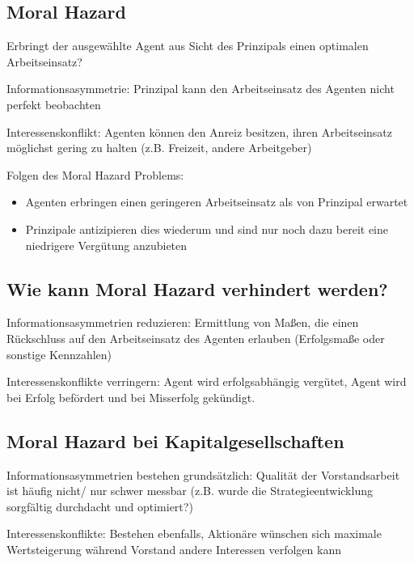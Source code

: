 \documentclass[
]{article}
\providecommand{\tightlist}{%
  \setlength{\itemsep}{0pt}\setlength{\parskip}{0pt}}
\begin{document}
\hypertarget{moral-hazard}{%
\subsection{Moral Hazard}\label{moral-hazard}}

Erbringt der ausgewählte Agent aus Sicht des Prinzipals einen optimalen
Arbeitseinsatz?

Informationsasymmetrie: Prinzipal kann den Arbeitseinsatz des Agenten
nicht perfekt beobachten

Interessenskonflikt: Agenten können den Anreiz besitzen, ihren
Arbeitseinsatz möglichst gering zu halten (z.B. Freizeit, andere
Arbeitgeber)

Folgen des Moral Hazard Problems:

\begin{itemize}
\tightlist
\item
  Agenten erbringen einen geringeren Arbeitseinsatz als von Prinzipal
  erwartet
\item
  Prinzipale antizipieren dies wiederum und sind nur noch dazu bereit
  eine niedrigere Vergütung anzubieten
\end{itemize}

\hypertarget{wie-kann-moral-hazard-verhindert-werden}{%
\subsection{Wie kann Moral Hazard verhindert
werden?}\label{wie-kann-moral-hazard-verhindert-werden}}

Informationsasymmetrien reduzieren: Ermittlung von Maßen, die einen
Rückschluss auf den Arbeitseinsatz des Agenten erlauben (Erfolgsmaße
oder sonstige Kennzahlen)

Interessenskonflikte verringern: Agent wird erfolgsabhängig vergütet,
Agent wird bei Erfolg befördert und bei Misserfolg gekündigt.

\hypertarget{moral-hazard-bei-kapitalgesellschaften}{%
\subsection{Moral Hazard bei
Kapitalgesellschaften}\label{moral-hazard-bei-kapitalgesellschaften}}

Informationsasymmetrien bestehen grundsätzlich: Qualität der
Vorstandsarbeit ist häufig nicht/ nur schwer messbar (z.B. wurde die
Strategieentwicklung sorgfältig durchdacht und optimiert?)

Interessenskonflikte: Bestehen ebenfalls, Aktionäre wünschen sich
maximale Wertsteigerung während Vorstand andere Interessen verfolgen
kann
\end{document}

